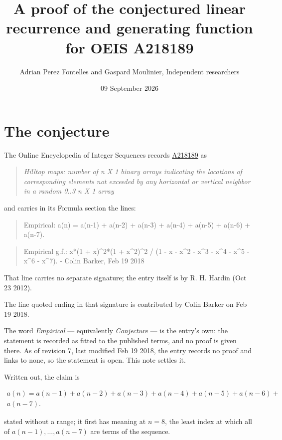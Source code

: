 \documentclass[11pt]{article}
\title{A proof of the conjectured linear recurrence and generating function for OEIS A218189}
\author{Adrian Perez Fontelles and Gaspard Moulinier, Independent researchers}
\date{09 September 2026}
\theoremstyle{definition}
\begin{document}
\maketitle
\section{The conjecture}

The Online Encyclopedia of Integer Sequences records \href{https://oeis.org/A218189}{A218189} as

\begin{quote}\itshape Hilltop maps: number of n X 1 binary arrays indicating the locations of corresponding elements not exceeded by any horizontal or vertical neighbor in a random 0..3 n X 1 array\end{quote}

and carries in its Formula section the lines:

\begin{quote}\ttfamily Empirical: a(n) = a(n-1) + a(n-2) + a(n-3) + a(n-4) + a(n-5) + a(n-6) + a(n-7).\end{quote}

\begin{quote}\ttfamily Empirical g.f.: x*(1 + x)\textasciicircum{}2*(1 + x\textasciicircum{}2)\textasciicircum{}2 / (1 - x - x\textasciicircum{}2 - x\textasciicircum{}3 - x\textasciicircum{}4 - x\textasciicircum{}5 - x\textasciicircum{}6 - x\textasciicircum{}7). - Colin Barker, Feb 19 2018\end{quote}

That line carries no separate signature; the entry itself is by R. H. Hardin (Oct 23 2012).

The line quoted ending in that signature is contributed by Colin Barker on Feb 19 2018.

The word {\itshape Empirical} --- equivalently {\itshape Conjecture} --- is the entry's own: the statement is recorded as fitted to the published terms, and no proof is given there. As of revision 7, last modified Feb 19 2018, the entry records no proof and links to none, so the statement is open. This note settles it.

Written out, the claim is

\begin{multline*} a(n) = a(n-1) + a(n-2) + a(n-3) + a(n-4) + a(n-5) + a(n-6) + \\ a(n-7). \end{multline*}

stated without a range; it first has meaning at $n = 8$, the least index at which all of $a(n-1),\dots,a(n-7)$ are terms of the sequence.
\end{document}
